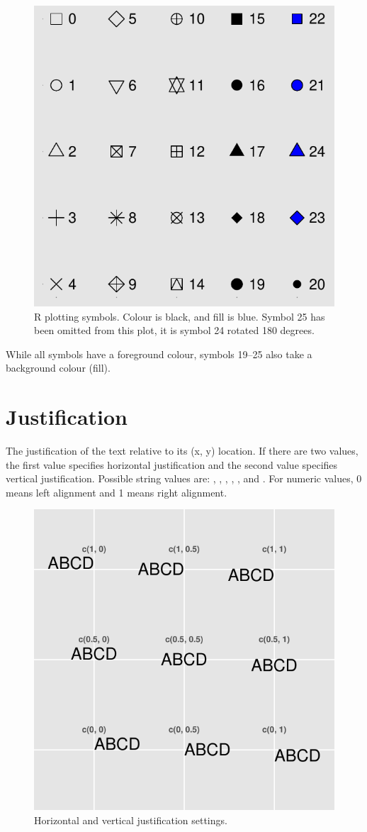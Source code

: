 \begin{figure}[htbp]
  \centering
    \includegraphics[width=0.5 \textwidth]{spec-shape}
  \caption{R plotting symbols.  Colour is black, and fill is blue.  Symbol 25 has been omitted from this plot, it is symbol 24 rotated 180 degrees.}
  \label{fig:shape}
\end{figure}

While all symbols have a foreground colour, symbols 19--25 also take a background colour (fill).  


\section{Justification}
\label{sec:justification_spec}

The justification of the text relative to its (x, y) location. If there are two values, the first value specifies horizontal justification and the second value specifies vertical justification. Possible string values are: , , , , , and . For numeric values, 0 means left alignment and 1 means right alignment.

\begin{figure}[htbp]
  \centering
    \includegraphics[width=0.5 \textwidth]{spec-justification}
  \caption{Horizontal and vertical justification settings.}
  \label{fig:justification}
\end{figure}

